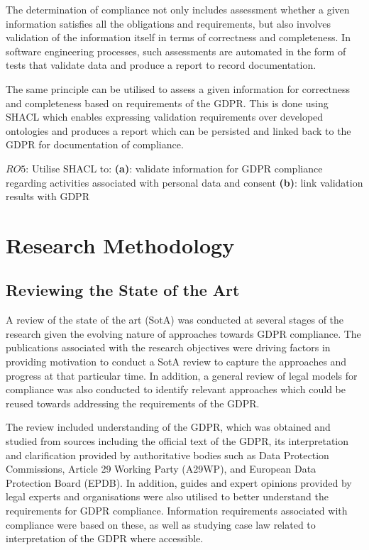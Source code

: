 The determination of compliance not only includes assessment whether a given information satisfies all the obligations and requirements, but also involves validation of the information itself in terms of correctness and completeness.
In software engineering processes, such assessments are automated in the form of tests that validate data and produce a report to record documentation.

The same principle can be utilised to assess a given information for correctness and completeness based on requirements of the GDPR.
This is done using SHACL which enables expressing validation requirements over developed ontologies and produces a report which can be persisted and linked back to the GDPR for documentation of compliance.
\begin{framed}
$RO5$: Utilise SHACL to:
\newline\indent\indent\textbf{(a)}: validate information for GDPR compliance regarding activities associated with personal data and consent
\newline\indent\indent\textbf{(b)}: link validation results with GDPR
\end{framed}

\section{Research Methodology}\label{sec:intro:research-methodology}
\subsection{Reviewing the State of the Art}
A review of the state of the art (SotA) was conducted at several stages of the research given the evolving nature of approaches towards GDPR compliance.
The publications associated with the research objectives were driving factors in providing motivation to conduct a SotA review to capture the approaches and progress at that particular time.
In addition, a general review of legal models for compliance was also conducted to identify relevant approaches which could be reused towards addressing the requirements of the GDPR.

The review included understanding of the GDPR, which was obtained and studied from sources including the official text of the GDPR, its interpretation and clarification provided by authoritative bodies such as Data Protection Commissions, Article 29 Working Party (A29WP), and European Data Protection Board (EPDB).
In addition, guides and expert opinions provided by legal experts and organisations were also utilised to better understand the requirements for GDPR compliance.
Information requirements associated with compliance were based on these, as well as studying case law related to interpretation of the GDPR where accessible.

